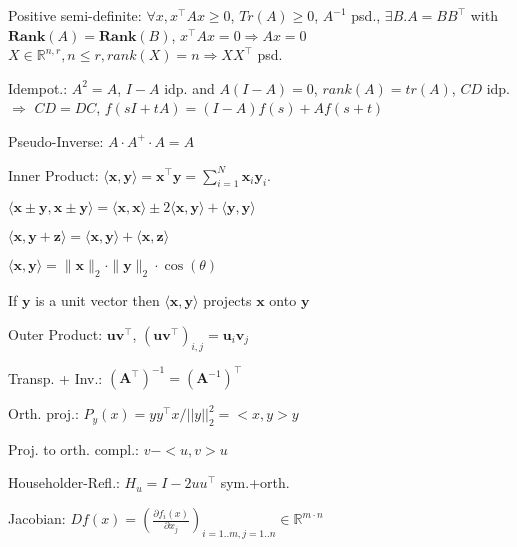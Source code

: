 \begin{compactdesc}
	\item[Positive semi-definite:] $\forall x, x^\top A x \geq 0$, $Tr(A)\geq 0$, $A^{-1}$ psd., $\exists B . A=BB^\top$ with $\mathbf{Rank}(A)=\mathbf{Rank}(B)$, $x^\top A x = 0 \Rightarrow A x = 0$ $X\in \mathbb{R}^{n,r}, n\leq r, rank(X)=n \Rightarrow XX^\top$ psd.
	\item[Idempot.:] $A^2 = A$, $I-A$ idp. and $A(I-A)=0$, $rank(A)=tr(A)$, $CD$ idp. $\Rightarrow$ $CD=DC$, $f(sI+tA)=(I-A)f(s)+A f(s+t)$
	\item[Pseudo-Inverse:] $A\cdot A^+\cdot A = A$
	\item[Inner Product:] $\langle \mathbf{x}, \mathbf{y} \rangle = \mathbf{x}^\top \mathbf{y} = \sum_{i=1}^{N} \mathbf{x}_i \mathbf{y}_i$.
	\begin{inparaitem}
		\item $\langle \mathbf{x} \pm \mathbf{y}, \mathbf{x} \pm \mathbf{y} \rangle = \langle \mathbf{x}, \mathbf{x} \rangle \pm 2 \langle \mathbf{x}, \mathbf{y} \rangle + \langle \mathbf{y}, \mathbf{y} \rangle$
		\item $\langle \mathbf{x}, \mathbf{y} + \mathbf{z} \rangle = \langle \mathbf{x}, \mathbf{y} \rangle + \langle \mathbf{x}, \mathbf{z} \rangle$
		\item $\langle \mathbf{x}, \mathbf{y} \rangle = \|\mathbf{x}\|_2 \cdot \|\mathbf{y}\|_2 \cdot \cos(\theta)$
		\item If $\mathbf{y}$ is a unit vector then $\langle \mathbf{x}, \mathbf{y} \rangle$ projects $\mathbf{x}$ onto $\mathbf{y}$
	\end{inparaitem}
	\item[Outer Product:] $\mathbf{u} \mathbf{v}^\top$, $(\mathbf{u} \mathbf{v}^\top)_{i, j} = \mathbf{u}_i \mathbf{v}_j$
	\item[Transp. + Inv.:] $(\mathbf{A}^\top)^{-1} = (\mathbf{A}^{-1})^\top$
	\item[Orth. proj.:] $P_y(x)=y y^\top x / ||y||^2_2 = <x,y>y$
	\item[Proj. to orth. compl.:] $v-<u,v>u$
	\item[Householder-Refl.:] $H_u=I-2uu^\top$ sym.+orth.
	\item[Jacobian:] $D f(x)=(\frac{\partial f_i(x)}{\partial x_j})_{i=1..m, j=1..n} \in \mathbb{R}^{m\cdot n}$
\end{compactdesc}

